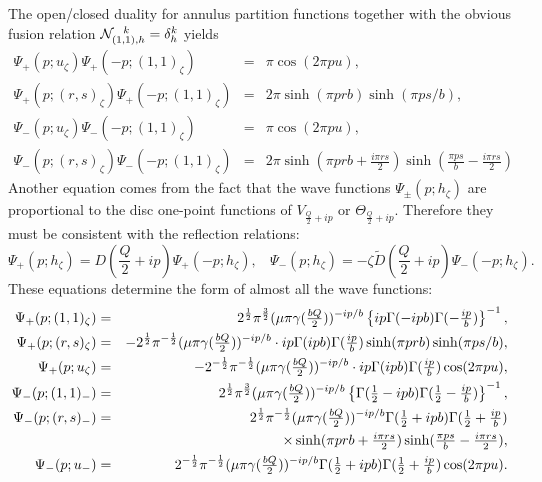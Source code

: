 \documentclass[a4paper,12pt]{article}
\newcommand{\tfrac}[2]{{\textstyle\frac{#1}{#2}}}
\begin{document}
   The open/closed duality for annulus partition functions 
 together with the obvious fusion relation
 ${\cal N}_{(1,1),h}^{~~k}=\delta_h^k$ yields
\begin{eqnarray}
  \Psi_+(p;u_\zeta)\Psi_+(-p;(1,1)_\zeta) &=&
  \pi\cos(2\pi pu), \nonumber \\
  \Psi_+(p;(r,s)_\zeta)\Psi_+(-p;(1,1)_\zeta) &=&
  2\pi\sinh(\pi prb)\sinh(\pi ps/b),\nonumber \\
  \Psi_-(p;u_\zeta)\Psi_-(-p;(1,1)_\zeta) &=&
  \pi\cos(2\pi pu), \nonumber \\
  \Psi_-(p;(r,s)_\zeta)\Psi_-(-p;(1,1)_\zeta) &=&
  2\pi\sinh(\pi prb+\tfrac{i\pi rs}{2})
   \sinh(\tfrac{\pi ps}{b}-\tfrac{i\pi rs}{2})
\end{eqnarray}
 Another equation comes from the fact that the wave functions
 $\Psi_\pm(p;h_\zeta)$ are proportional to the disc one-point
 functions of $V_{\frac{Q}{2}+ip}$ or $\Theta_{\frac{Q}{2}+ip}$.
 Therefore they must be consistent with the reflection relations:
\begin{equation}
 \Psi_+(p;h_\zeta)=D(\tfrac{Q}{2}+ip)\Psi_+(-p;h_\zeta),~~~~
 \Psi_-(p;h_\zeta)=-\zeta\tilde{D}(\tfrac{Q}{2}+ip)\Psi_-(-p;h_\zeta).
\end{equation}
 These equations determine the form of almost all the wave functions:
\begin{eqnarray}
  \Psi_+(p;(1,1)_\zeta) &=&
 2^{\frac{1}{2}}\pi^{\frac{3}{2}}(\mu\pi\gamma(\tfrac{bQ}{2}))^{-ip/b}
 \left\{ip\Gamma(-ipb)\Gamma(-\tfrac{ip}{b})\right\}^{-1}     , \nonumber\\
  \Psi_+(p;(r,s)_\zeta) &=&
 -2^{\frac{1}{2}}\pi^{-\frac{1}{2}}(\mu\pi\gamma(\tfrac{bQ}{2}))^{-ip/b}\cdot
  ip\Gamma(ipb)\Gamma(\tfrac{ip}{b})
  \sinh(\pi prb)\sinh(\pi ps/b),
  \nonumber\\
  \Psi_+(p;u_\zeta) &=&
 -2^{-\frac{1}{2}}\pi^{-\frac{1}{2}}(\mu\pi\gamma(\tfrac{bQ}{2}))^{-ip/b}\cdot
  ip\Gamma(ipb)\Gamma(\tfrac{ip}{b})\cos(2\pi pu), \nonumber\\
  \Psi_-(p;(1,1)_-) &=&
 2^{\frac{1}{2}}\pi^{\frac{3}{2}}(\mu\pi\gamma(\tfrac{bQ}{2}))^{-ip/b}
 \left\{\Gamma(\tfrac{1}{2}-ipb)\Gamma(\tfrac{1}{2}-\tfrac{ip}{b})
 \right\}^{-1}, \nonumber\\
  \Psi_-(p;(r,s)_-) &=&
 2^{\frac{1}{2}}\pi^{-\frac{1}{2}}(\mu\pi\gamma(\tfrac{bQ}{2}))^{-ip/b}
  \Gamma(\tfrac{1}{2}+ipb)
  \Gamma(\tfrac{1}{2}+\tfrac{ip}{b})
 \nonumber \\ && \hskip30mm\times
   \sinh(\pi prb+\tfrac{i\pi rs}{2})
   \sinh(\tfrac{\pi ps}{b}-\tfrac{i\pi rs}{2}),
  \nonumber\\
  \Psi_-(p;u_-) &=&
 2^{-\frac{1}{2}}\pi^{-\frac{1}{2}}(\mu\pi\gamma(\tfrac{bQ}{2}))^{-ip/b}
  \Gamma(\tfrac{1}{2}+ipb)\Gamma(\tfrac{1}{2}+\tfrac{ip}{b})\cos(2\pi pu).
\end{eqnarray}
\end{document}
